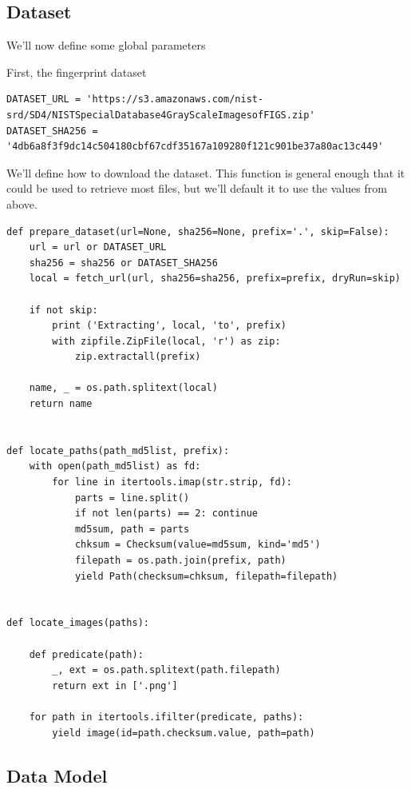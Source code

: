 \subsection{Dataset}\label{dataset}

We'll now define some global parameters

First, the fingerprint dataset

\begin{lstlisting}
DATASET_URL = 'https://s3.amazonaws.com/nist-srd/SD4/NISTSpecialDatabase4GrayScaleImagesofFIGS.zip'
DATASET_SHA256 = '4db6a8f3f9dc14c504180cbf67cdf35167a109280f121c901be37a80ac13c449'
\end{lstlisting}

We'll define how to download the dataset. This function is general
enough that it could be used to retrieve most files, but we'll default
it to use the values from above.

\begin{lstlisting}
def prepare_dataset(url=None, sha256=None, prefix='.', skip=False):
    url = url or DATASET_URL
    sha256 = sha256 or DATASET_SHA256
    local = fetch_url(url, sha256=sha256, prefix=prefix, dryRun=skip)

    if not skip:
        print ('Extracting', local, 'to', prefix)
        with zipfile.ZipFile(local, 'r') as zip:
            zip.extractall(prefix)

    name, _ = os.path.splitext(local)
    return name


def locate_paths(path_md5list, prefix):
    with open(path_md5list) as fd:
        for line in itertools.imap(str.strip, fd):
            parts = line.split()
            if not len(parts) == 2: continue
            md5sum, path = parts
            chksum = Checksum(value=md5sum, kind='md5')
            filepath = os.path.join(prefix, path)
            yield Path(checksum=chksum, filepath=filepath)


def locate_images(paths):

    def predicate(path):
        _, ext = os.path.splitext(path.filepath)
        return ext in ['.png']

    for path in itertools.ifilter(predicate, paths):
        yield image(id=path.checksum.value, path=path)
\end{lstlisting}

\subsection{Data Model}\label{data-model}

